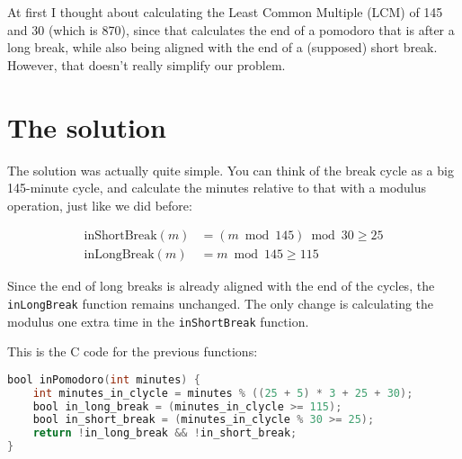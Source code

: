\documentclass{amsart}
\begin{document}
At first I thought about calculating the Least Common Multiple (LCM) of 145 and
30 (which is 870), since that calculates the end of a pomodoro that is after a
long break, while also being aligned with the end of a (supposed) short
break. However, that doesn't really simplify our problem.

\section{The solution}

The solution was actually quite simple. You can think of the break cycle as a
big 145-minute cycle, and calculate the minutes relative to that with a modulus
operation, just like we did before:

\begin{align*}
  \text{inShortBreak}(m) &= \left( m \bmod 145 \right) \bmod 30 \geq 25 \\
  \text{inLongBreak}(m)  &= m \bmod 145 \geq 115
\end{align*}

Since the end of long breaks is already aligned with the end of the cycles, the
\texttt{inLongBreak} function remains unchanged. The only change is calculating
the modulus one extra time in the \texttt{inShortBreak} function.

This is the C code for the previous functions:

\begin{lstlisting}[language=C]
bool inPomodoro(int minutes) {
    int minutes_in_clycle = minutes % ((25 + 5) * 3 + 25 + 30);
    bool in_long_break = (minutes_in_clycle >= 115);
    bool in_short_break = (minutes_in_clycle % 30 >= 25);
    return !in_long_break && !in_short_break;
}
\end{lstlisting}
\end{document}
